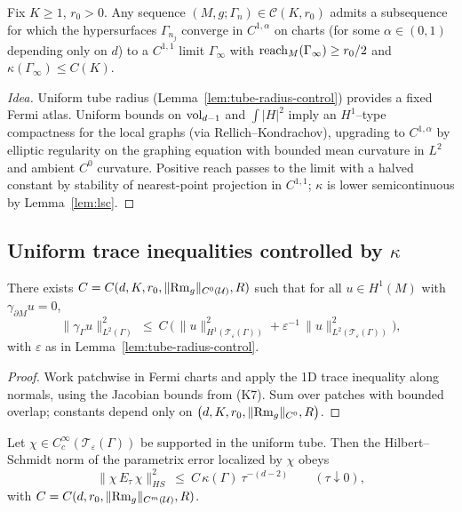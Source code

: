 \begin{proposition}
\label{prop:precompact}
Fix $K\ge 1$, $r_0>0$.
Any sequence $(M,g;\Gamma_n)\in \mathcal{C}(K,r_0)$ admits a subsequence for which the hypersurfaces $\Gamma_{n_j}$ converge in $C^{1,\alpha}$ on charts (for some $\alpha\in(0,1)$ depending only on $d$) to a $C^{1,1}$ limit $\Gamma_\infty$ with $\operatorname{reach}_M(\Gamma_\infty)\ge r_0/2$ and $\kappa(\Gamma_\infty)\le C(K)$.
\end{proposition}

\begin{proof}[Idea]
Uniform tube radius (Lemma~\ref{lem:tube-radius-control}) provides a fixed Fermi atlas. Uniform bounds on $\operatorname{vol}_{d-1}$ and $\int|H|^2$ imply an $H^1$–type compactness for the local graphs (via Rellich–Kondrachov),
upgrading to $C^{1,\alpha}$ by elliptic regularity on the graphing equation with bounded mean curvature in $L^2$ and ambient $C^0$ curvature. Positive reach passes to the limit with a halved constant by stability of nearest-point projection in $C^{1,1}$; $\kappa$ is lower semicontinuous by Lemma~\ref{lem:lsc}.
\end{proof}

\subsection{Uniform trace inequalities controlled by $\kappa$}
\label{subsec:trace-ineq}

\begin{proposition}
\label{prop:trace}
There exists $C=C(d,K,r_0,\|{\rm Rm}_g\|_{C^0(\mathcal{U})},R)$ such that for all $u\in H^1(M)$ with $\gamma_{\partial M}u=0$,
\[
\|\gamma_\Gamma u\|_{L^2(\Gamma)}^2\ \le\ C\,\Big(\,\|u\|_{H^1(\mathcal{T}_\varepsilon(\Gamma))}^2 + \varepsilon^{-1}\,\|u\|_{L^2(\mathcal{T}_\varepsilon(\Gamma))}^2\Big),
\]
with $\varepsilon$ as in Lemma~\ref{lem:tube-radius-control}.
\end{proposition}

\begin{proof}
Work patchwise in Fermi charts and apply the 1D trace inequality along normals, using the Jacobian bounds from (K7). Sum over patches with bounded overlap; constants depend only on $\big(d,K,r_0,\|{\rm Rm}_g\|_{C^0},R\big)$.
\end{proof}

\begin{corollary}
\label{cor:hs}
Let $\chi\in C_c^\infty(\mathcal{T}_\varepsilon(\Gamma))$ be supported in the uniform tube.
Then the Hilbert–Schmidt norm of the parametrix error localized by $\chi$ obeys
\[
\| \chi\,E_\tau\,\chi\|_{HS}^2\ \le\ C\,\kappa(\Gamma)\ \tau^{-(d-2)}\qquad (\tau\downarrow 0),
\]
with $C=C(d,r_0,\|{\rm Rm}_g\|_{C^m(\mathcal{U})},R)$.
\end{corollary}

